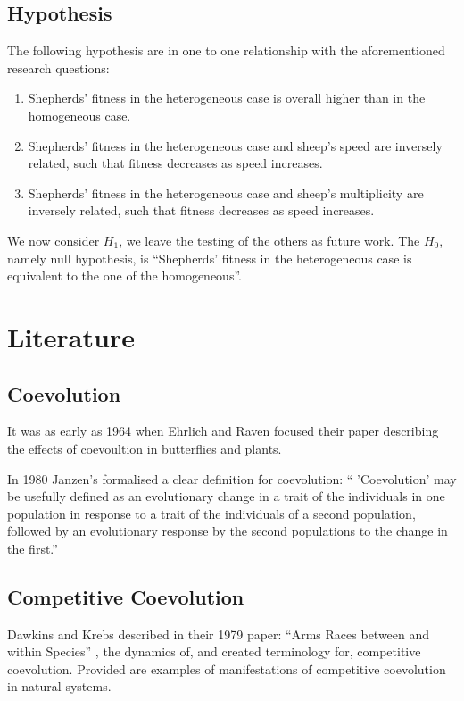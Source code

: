 \documentclass[conference]{IEEEtran}
\begin{document}
\subsection{Hypothesis}
\label{sec:hypothesis}
The following hypothesis are in one to one relationship with the aforementioned research questions:

\begin{enumerate}
	\item Shepherds’ fitness in the heterogeneous case is overall higher than in the homogeneous case.
	\item Shepherds’ fitness in the heterogeneous case and sheep’s speed are inversely related, such that fitness decreases as speed increases.
	\item Shepherds’ fitness in the heterogeneous case and sheep’s multiplicity are inversely related, such that fitness decreases as speed increases.
\end{enumerate}

We now consider $H_1$, we leave the testing of the others as future work. The $H_0$, namely null hypothesis, is ``Shepherds’ fitness in the heterogeneous case is equivalent to the one of the homogeneous''.

\section{Literature}
 
\subsection{Coevolution}
It was as early as 1964 when Ehrlich and Raven focused their paper \cite{ehrlich1964butterflies} describing the effects of coevoultion in butterflies and plants.

In 1980 Janzen's \cite{janzen1980coevolution} formalised a clear definition for coevolution:
`` 'Coevolution' may be usefully defined as an evolutionary change in a trait of the individuals in one population in response to a trait of the individuals of a second population, followed by an evolutionary response by the second populations to the change in the first.''


\subsection{Competitive Coevolution}
Dawkins and Krebs described in their 1979 paper: ``Arms Races between and within Species'' \cite{dawkins1979arms}, the dynamics of, and created terminology for, competitive coevolution. Provided are examples of manifestations of competitive coevolution in natural systems.
\end{document}

